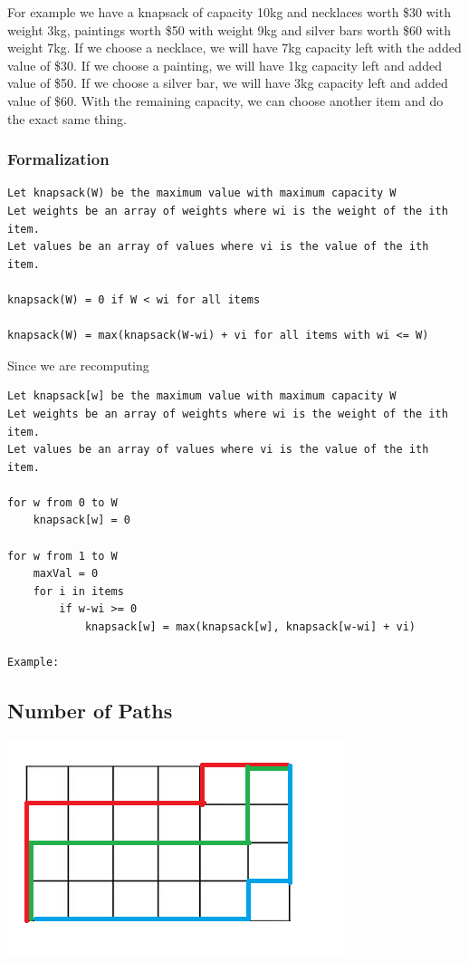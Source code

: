 \documentclass[11pt,oneside]{book}
\makeatletter
\def\maxwidth#1{\ifdim\Gin@nat@width>#1 #1\else\Gin@nat@width\fi}
\makeatother
\begin{document}
For example we have a knapsack of capacity 10kg and necklaces worth \$30 with weight 3kg, paintings worth \$50 with weight 9kg and silver bars worth \$60 with weight 7kg. If we choose a necklace, we will have 7kg capacity left with the added value of \$30. If we choose a painting, we will have 1kg capacity left and added value of \$50. If we choose a silver bar, we will have 3kg capacity left and added value of \$60. With the remaining capacity, we can choose another item and do the exact same thing.

\subsubsection{Formalization}

\begin{lstlisting}
Let knapsack(W) be the maximum value with maximum capacity W
Let weights be an array of weights where wi is the weight of the ith item.
Let values be an array of values where vi is the value of the ith item.

knapsack(W) = 0 if W < wi for all items

knapsack(W) = max(knapsack(W-wi) + vi for all items with wi <= W)
\end{lstlisting}

Since we are recomputing

\begin{lstlisting}
Let knapsack[w] be the maximum value with maximum capacity W
Let weights be an array of weights where wi is the weight of the ith item.
Let values be an array of values where vi is the value of the ith item.

for w from 0 to W
    knapsack[w] = 0

for w from 1 to W
    maxVal = 0
    for i in items
        if w-wi >= 0
            knapsack[w] = max(knapsack[w], knapsack[w-wi] + vi)

Example:

\end{lstlisting}

\subsection{Number of Paths}

\vspace{5px}\includegraphics[width=\maxwidth{\textwidth}]{recursion_grid.png}
\end{document}
